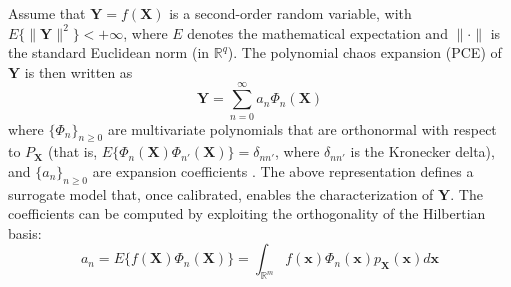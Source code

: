 \documentclass[preprint,review,12pt]{elsarticle}
\begin{document}
Assume that $\mathbf{Y} = f(\mathbf{X})$ is a second-order random variable, with $E\{\|\mathbf{Y}\|^2\} < + \infty$, where $E$ denotes the mathematical expectation and $\|\cdot\|$ is the standard Euclidean norm (in $\mathbb{R}^q$). The polynomial chaos expansion (PCE) of $\mathbf{Y}$ is then written as 
\begin{equation}
    \mathbf{Y} = \sum_{n=0}^{\infty} a_n \Phi_n(\mathbf{X})
\end{equation}
where $\{\Phi_n\}_{n \geq 0}$ are multivariate polynomials that are orthonormal with respect to $P_{\mathbf{X}}$ (that is, $E\{\Phi_n(\mathbf{X})\Phi_{n'}(\mathbf{X})\} = \delta_{nn'}$, where $\delta_{nn'}$ is the Kronecker delta), and $\{a_n\}_{n \geq 0}$ are expansion coefficients \citep{ghanem2003stochastic,ghanem2017handbook}. The above representation defines a surrogate model that, once calibrated, enables the characterization of $\mathbf{Y}$. The coefficients can be computed by exploiting the orthogonality of the Hilbertian basis:
\begin{equation}\label{eq:def-an}
    a_n = E\{f(\mathbf{X}) \Phi_n(\mathbf{X})\} = \int_{\mathbb{R}^m} f(\mathbf{x}) \Phi_n(\mathbf{x}) p_{\mathbf{X}}(\mathbf{x}) d\mathbf{x}
\end{equation}
\end{document}
